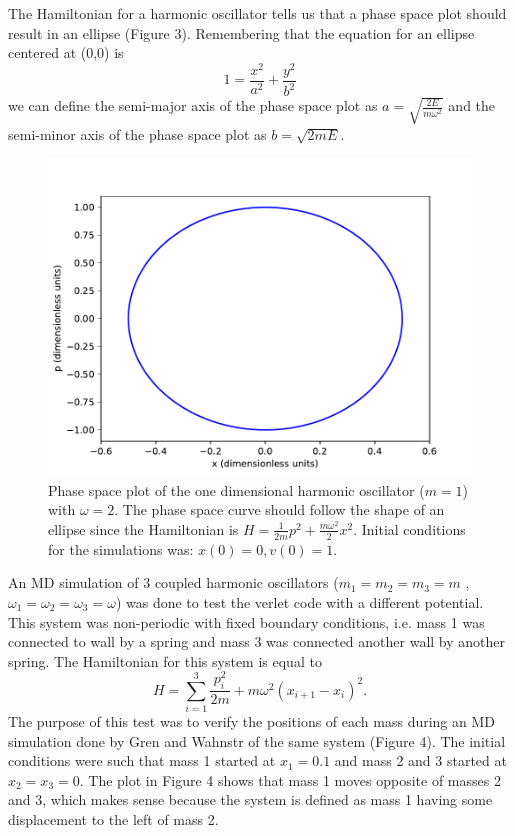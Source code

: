\documentclass{article}
\newcommand{\be}{\begin{equation}}
\newcommand{\ee}{\end{equation}}
\begin{document}
The Hamiltonian for a harmonic oscillator tells us that a phase space plot should result in an ellipse (Figure 3).
Remembering that the equation for an ellipse centered at (0,0) is
\be
  1 = \frac{x^2}{a^2} + \frac{y^2}{b^2}
\ee
we can define the semi-major axis of the phase space plot as $a = \sqrt{\frac{2E}{m \omega^2}}$ and the semi-minor axis of the phase space plot as $b = \sqrt{2mE}$.
\begin{figure}[H]
  \centering
  \includegraphics[scale=0.7]{Figures/1dverlet/phasespace_w2.pdf}
    \caption{Phase space plot of the one dimensional harmonic oscillator ($m = 1$) with $\omega = 2$. The phase space curve should follow the shape of an ellipse since the Hamiltonian is $H = \frac{1}{2m}p^2 + \frac{m \omega^2}{2}x^2$. Initial conditions for the simulations was: $x(0) = 0, v(0) = 1$.}
\end{figure}
An MD simulation of 3 coupled harmonic oscillators ($m_1 = m_2 = m_3 = m$ , $\omega_1 = \omega_2 = \omega_3 = \omega$) was done to test the verlet code with a different potential.
This system was non-periodic with fixed boundary conditions, i.e. mass 1 was connected to wall by a spring and mass 3 was connected another wall by another spring.
The Hamiltonian for this system is equal to
\be
  H = \sum_{i=1}^{3} \frac{p_i^2}{2 m} + m \omega^2 (x_{i+1} - x_{i})^2 .
\ee
The purpose of this test was to verify the positions of each mass during an MD simulation done by Gren and Wahnstr of the same system (Figure 4).
The initial conditions were such that mass 1 started at $x_1 = 0.1$ and mass 2 and 3 started at $x_2 = x_3 = 0$.
The plot in Figure 4 shows that mass 1 moves opposite of masses 2 and 3, which makes sense because the system is defined as mass 1 having some displacement to the left of mass 2.
\end{document}
